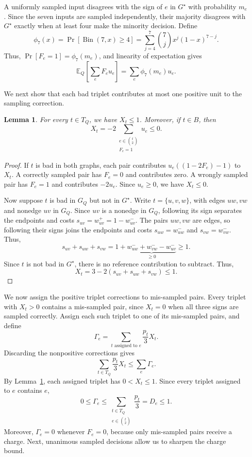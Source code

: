 \documentclass[11pt]{article}
\newtheorem{lemma}[theorem]{Lemma}
\theoremstyle{definition}
\theoremstyle{remark}
\newcommand{\F}{\mathcal{F}}
\newcommand{\1}{\mathbf{1}}
\begin{document}
A uniformly sampled input disagrees with the sign of $e$
in $G^\star$ with probability $m_e$. Since the seven inputs
are sampled independently, their majority disagrees with
$G^\star$ exactly when at least four make the minority
decision. Define
\[
    \phi_7(x)
    =\Pr[\operatorname{Bin}(7,x)\geq4]
    =\sum_{j=4}^{7}\binom{7}{j}x^j(1-x)^{7-j}.
\]
Thus, $\Pr[F_e=1]=\phi_7(m_e)$, and linearity of expectation
gives
\[
    \mathbb E_Q\!\left[\sum_e F_eu_e\right]
        =\sum_e\phi_7(m_e)u_e.
\]

We next show that each bad triplet contributes at most one
positive unit to the sampling correction.

\begin{lemma}
\label{lem:triplet-correction}
For every $t\in T_Q$, we have $X_t\leq 1$.
Moreover, if $t\in B$, then
\[
    X_t=-2\sum_{\substack{e\in\binom{t}{2}\\F_e=1}}u_e
    \leq 0.
\]
\end{lemma}

\begin{proof}
If $t$ is bad in both graphs, each pair contributes
$u_e((1-2F_e)-1)$ to $X_t$. A correctly sampled pair has
$F_e=0$ and contributes zero. A wrongly sampled pair has
$F_e=1$ and contributes $-2u_e$. Since $u_e\geq0$, we have
$X_t\leq0$.


Now suppose $t$ is bad in $G_Q$ but not in $G^\star$.
Write $t=\{u,v,w\}$, with edges $uw,vw$ and nonedge $uv$
in $G_Q$.  Since $uv$ is a nonedge in $G_Q$, following its sign separates the endpoints and costs $s_{uv}=w_{uv}^+=1-w_{uv}^-$.
The pairs $uw,vw$ are edges, so following their signs joins
the endpoints and costs $s_{uw}=w_{uw}^-$ and $s_{vw}=w_{vw}^-$.
Thus,
\[
    s_{uv}+s_{uw}+s_{vw}
    =1+\underbrace{
        w_{uw}^-+w_{vw}^- -w_{uv}^-
      }_{\geq0}
    \geq1.
\]
Since $t$ is not bad in $G^\star$, there is no reference
contribution to subtract. Thus,
\[
    X_t
    =3-2(s_{uv}+s_{uw}+s_{vw})
    \leq1.
\]
\end{proof}
We now assign the positive triplet corrections to mis-sampled pairs. Every triplet with $X_t>0$ contains a mis-sampled pair, since
$X_t=0$ when all three signs are sampled correctly.
Assign each such triplet to one of its mis-sampled pairs, and define
\[
    \Gamma_e
    =\sum_{t\text{ assigned to }e}\frac{p_t}{3}X_t.
\]
Discarding the nonpositive corrections gives
\[
    \sum_{t\in T_Q}\frac{p_t}{3}X_t\leq\sum_e\Gamma_e.
\]
By Lemma~\ref{lem:triplet-correction}, each assigned triplet has
$0<X_t\leq1$. Since every triplet assigned to $e$ contains $e$,
\[
    0\leq\Gamma_e
    \leq\sum_{\substack{t\in T_Q\\e\in\binom{t}{2}}}\frac{p_t}{3}
    =D_e\leq1.
\]
Moreover, $\Gamma_e=0$ whenever $F_e=0$, because only mis-sampled
pairs receive a charge. Next, unanimous sampled decisions allow us to sharpen the charge bound.
\end{document}
